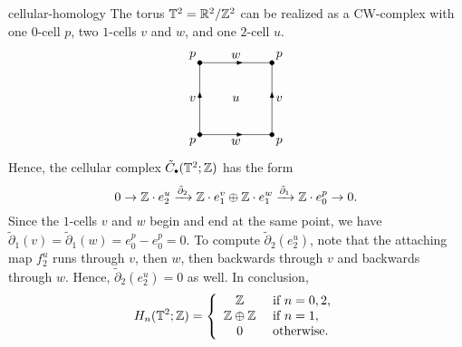 \begin{example}{cellular-homology}
    The torus $\mathbb{T}^2 = \mathbb{R}^2 / \mathbb{Z}^2$ can be realized as a CW-complex with one $0$-cell $p$, two $1$-cells $v$ and $w$, and one $2$-cell $u$.
    \[ \begin{tikzpicture}[scale=2.0]
        \draw (0, 0) -- (1, 0) -- (1, 1) -- (0, 1) -- (0, 0);
        \draw[black,fill=black] (0,0) circle (.2ex);
        \draw[black,fill=black] (0,1) circle (.2ex);
        \draw[black,fill=black] (1,0) circle (.2ex);
        \draw[black,fill=black] (1,1) circle (.2ex);
        \node at (-0.1, -0.1) {$p$};
        \node at (-0.1, 1.1) {$p$};
        \node at (1.1, -0.1) {$p$};
        \node at (1.1, 1.1) {$p$};
        \node at (-0.1, 0.5) {$v$};
        \node at (1.1, 0.5) {$v$};
        \node at (0.5, -0.1) {$w$};
        \node at (0.5, 1.1) {$w$};
        \node at (0.5, 0.5) {$u$};
        \draw[-{Latex}] (0.5,0) -- +(0.1,0);
        \draw[-{Latex}] (0.5,1) -- +(0.1,0);
        \draw[-{Latex}] (0,0.5) -- +(0,0.1);
        \draw[-{Latex}] (1,0.5) -- +(0,0.1);
    \end{tikzpicture} \]
    Hence, the cellular complex $\tilde{C}_\bdot(\mathbb{T}^2; \ZZ)$ has the form
    \[ 0 \to \mathbb{Z} \cdot e_2^u \xrightarrow{\tilde{\partial}_2} \mathbb{Z} \cdot e_1^v \oplus \mathbb{Z} \cdot e_1^w \xrightarrow{\tilde{\partial}_1} \mathbb{Z} \cdot e_0^p \to 0 . \]
    Since the $1$-cells $v$ and $w$ begin and end at the same point, we have $\tilde{\partial}_1(v) = \tilde{\partial}_1(w) = e_0^p - e_0^p = 0$. To compute $\tilde{\partial}_2(e_2^u)$, note that the attaching map $f_2^u$ runs through $v$, then $w$, then backwards through $v$ and backwards through $w$. Hence, $\tilde{\partial}_2(e_2^u) = 0$ as well. In conclusion,
    \[ H_n(\mathbb{T}^2; \mathbb{Z}) = \left\{ \begin{array}{cl} \mathbb{Z} & \textup{ if } n = 0, 2 , \\ \mathbb{Z} \oplus \mathbb{Z} & \textup{ if } n = 1 , \\ 0 & \textup{ otherwise.}  \end{array} \right. \]
\end{example}

